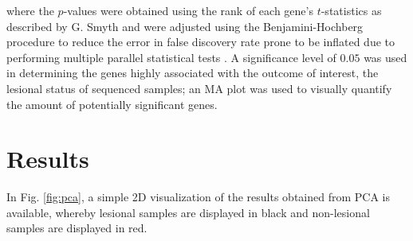 \documentclass[journal, a4paper]{IEEEtran}
\begin{document}
\noindent where the $p$-values were obtained using the rank of each gene's $t$-statistics as described by G. Smyth and were adjusted using the Benjamini-Hochberg procedure to reduce the error in false discovery rate prone to be inflated due to performing multiple parallel statistical tests \cite{smyth2004linear, benjamini2010discovering}. A significance level of $0.05$ was used in determining the genes highly associated with the outcome of interest, the lesional status of sequenced samples; an MA plot was used to visually quantify the amount of potentially significant genes.\\



\section{Results}

In Fig. \ref{fig:pca}, a simple 2D visualization of the results obtained from PCA is available, whereby lesional samples are displayed in black and non-lesional samples are displayed in red.
\end{document}
